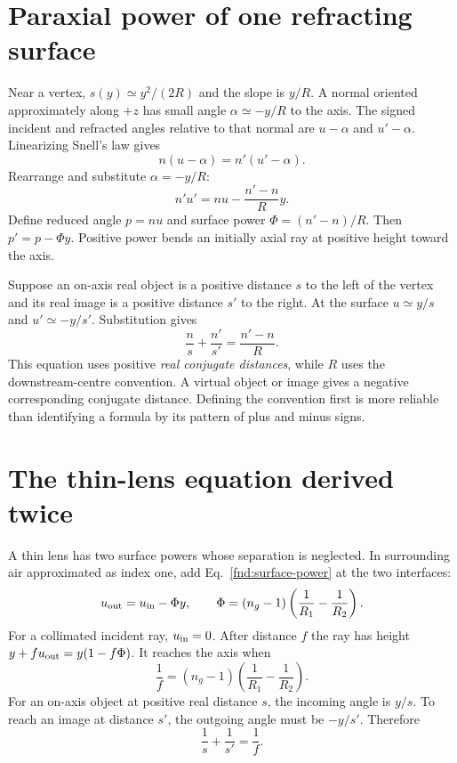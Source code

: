 \section{Paraxial power of one refracting surface}
Near a vertex, $s(y)\simeq y^2/(2R)$ and the slope is $y/R$. A normal oriented approximately along $+z$ has small angle $\alpha\simeq-y/R$ to the axis. The signed incident and refracted angles relative to that normal are $u-\alpha$ and $u'-\alpha$. Linearizing Snell's law gives
\[
n(u-\alpha)=n'(u'-\alpha).
\]
Rearrange and substitute $\alpha=-y/R$:
\begin{equation}
n'u'=nu-\frac{n'-n}{R}y.
\label{fnd:surface-power}
\end{equation}
Define reduced angle $p=nu$ and surface power $\Phi=(n'-n)/R$. Then $p'=p-\Phi y$. Positive power bends an initially axial ray at positive height toward the axis.

Suppose an on-axis real object is a positive distance $s$ to the left of the vertex and its real image is a positive distance $s'$ to the right. At the surface $u\simeq y/s$ and $u'\simeq-y/s'$. Substitution gives
\begin{equation}
\boxed{\frac{n}{s}+\frac{n'}{s'}=\frac{n'-n}{R}.}
\end{equation}
This equation uses positive \emph{real conjugate distances}, while $R$ uses the downstream-centre convention. A virtual object or image gives a negative corresponding conjugate distance. Defining the convention first is more reliable than identifying a formula by its pattern of plus and minus signs.

\section{The thin-lens equation derived twice}
A thin lens has two surface powers whose separation is neglected. In surrounding air approximated as index one, add Eq.~\eqref{fnd:surface-power} at the two interfaces:
\[
u_{\rm out}=u_{\rm in}-\Phi y,
\qquad \Phi=(n_g-1)\left(\frac{1}{R_1}-\frac{1}{R_2}\right).
\]
For a collimated incident ray, $u_{\rm in}=0$. After distance $f$ the ray has height $y+fu_{\rm out}=y(1-f\Phi)$. It reaches the axis when
\begin{equation}
\boxed{\frac{1}{f}=(n_g-1)\left(\frac{1}{R_1}-\frac{1}{R_2}\right).}
\label{fnd:lensmaker}
\end{equation}
For an on-axis object at positive real distance $s$, the incoming angle is $y/s$. To reach an image at distance $s'$, the outgoing angle must be $-y/s'$. Therefore
\begin{equation}
\boxed{\frac{1}{s}+\frac{1}{s'}=\frac{1}{f}.}
\label{fnd:thinlens}
\end{equation}

